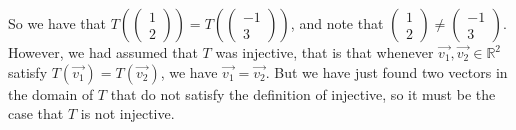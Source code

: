 \documentclass[12pt]{article}
\newenvironment{problem}[2][Problem]
{
	\begin{trivlist} 
		\item[\hskip \labelsep {\bfseries #1 #2:}]
	}
{
	\end{trivlist}
	}
\newenvironment{solution}[1][Solution]
{
	\begin{trivlist} 
		\item[\hskip \labelsep {\itshape #1:}]
	}
	{
	\end{trivlist}
}
\begin{document}
\begin{problem}{3}
\begin{solution}
So we have that $T\left(\begin{pmatrix} 1 \\ 2\end{pmatrix} \right)=T\left(\begin{pmatrix} -1 \\ 3\end{pmatrix} \right)$, and note that $\begin{pmatrix} 1 \\ 2\end{pmatrix} \neq \begin{pmatrix} -1 \\ 3\end{pmatrix}$. However, we had assumed that $T$ was injective, that is that whenever $\vec{v_{1}},\vec{v_{2}} \in \mathbb{R}^2$ satisfy $T(\vec{v_{1}})=T(\vec{v_{2}})$, we have $\vec{v_{1}} =\vec{v_{2}}$. But we have just found two vectors in the domain of $T$ that do not satisfy the definition of injective, so it must be the case that $T$ is not injective.
\end{solution}
\end{problem}
\end{document}
